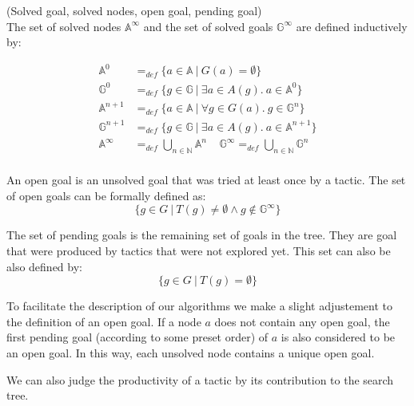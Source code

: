 \documentclass[runningheads,a4paper,draft]{svjour3}
\begin{document}
\begin{definition}\label{def:solved}(Solved goal, solved nodes, open goal, 
pending goal)\\
The set of solved nodes $\mathbb{A}^\infty$ and 
the set of solved goals $\mathbb{G}^\infty$ are defined inductively by:

\begin{align*}
\mathbb{A}^{0} &=_{def} 
\lbrace a \in \mathbb{A}\ |\ G(a) = \emptyset \rbrace \\ 
\mathbb{G}^{0} &=_{def} \lbrace g \in \mathbb{G}\ |\ 
\exists a \in A(g).\ a \in \mathbb{A}^{0} \rbrace\\
\mathbb{A}^{n+1} &=_{def} \lbrace a \in \mathbb{A}\ |\ 
\forall g \in G(a).\ g \in \mathbb{G}^{n} \rbrace\\
\mathbb{G}^{n+1} &=_{def} \lbrace g \in \mathbb{G}\ |\ 
\exists a \in A(g).\ a \in \mathbb{A}^{n+1} \rbrace \\
\mathbb{A}^\infty &=_{def} \bigcup_{n \in \mathbb{N}} \mathbb{A}^n \ \ \ \ \ 
\mathbb{G}^\infty =_{def} \bigcup_{n \in \mathbb{N}} \mathbb{G}^n\\
\end{align*}

An open goal is an unsolved goal that was tried at least once by a tactic. The 
set of open goals can be formally defined as:  
\[\lbrace g \in G\ |\  T(g) \neq \emptyset \wedge g \notin \mathbb{G}^\infty 
\rbrace\]

The set of pending goals is the remaining set of goals in the tree. They are 
goal that were produced by tactics that were not explored yet. This set can 
also be also defined by:
\[\lbrace g \in G\ |\  T(g) = \emptyset \rbrace\]

To facilitate the description  of our algorithms we make a slight adjustement 
to the definition of an open goal. If a node $a$ does not contain any open 
goal, the first pending goal (according 
to some preset order) of $a$ is also considered to be an open goal. In this 
way, each unsolved node contains a unique open goal.
\end{definition}


We can also judge the productivity of a tactic by its contribution to the 
search 
tree. 
\end{document}
